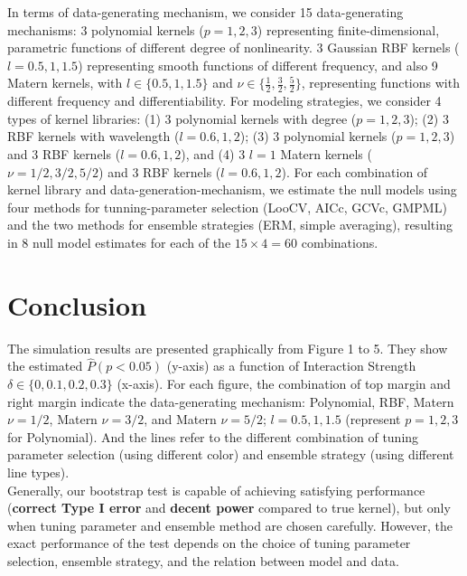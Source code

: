 \documentclass[11pt]{article}
\begin{document}
In terms of data-generating mechanism, we consider 15 data-generating mechanisms: 3 polynomial kernels ($p=1, 2, 3$) representing finite-dimensional, parametric functions of different degree of nonlinearity. 3 Gaussian RBF kernels ($l=0.5, 1, 1.5$) representing smooth functions of different frequency, and also 9 Matern kernels, with $l \in \{0.5, 1, 1.5\}$ and $\nu \in \{\frac{1}{2}, \frac{3}{2}, \frac{5}{2}\}$, representing functions with different frequency and differentiability. For modeling strategies, we consider 4 types of kernel libraries: (1) 3 polynomial kernels with degree ($p=1, 2, 3$); (2) 3 RBF kernels with wavelength ($l=0.6, 1, 2$); (3) 3 polynomial kernels ($p=1, 2, 3$) and 3 RBF kernels ($l=0.6, 1, 2$), and (4) 3 $l=1$ Matern kernels ($\nu=1/2, 3/2, 5/2$) and 3 RBF kernels ($l=0.6, 1, 2$). For each combination of kernel library and data-generation-mechanism, we estimate the null models using four methods for tunning-parameter selection (LooCV, AICc, GCVc, GMPML) and the two methods for ensemble strategies (ERM, simple averaging), resulting in 8 null model estimates for each of the $15 \times 4 = 60$ combinations.

\section{{\bf Conclusion}}
The simulation results are presented graphically from Figure 1 to 5. They show the estimated $\hat{P}(p<0.05)$ (y-axis) as a function of Interaction Strength $\delta \in \{0, 0.1, 0.2, 0.3\}$ (x-axis). For each figure, the combination of top margin and right margin indicate the data-generating mechanism: Polynomial, RBF, Matern $\nu=1/2$, Matern $\nu=3/2$, and Matern $\nu=5/2$; $l=0.5, 1, 1.5$ (represent $p=1, 2, 3$ for Polynomial). And the lines refer to the different combination of tuning parameter selection (using different color) and ensemble strategy (using different line types).\\

Generally, our bootstrap test is capable of achieving satisfying performance (\textbf{correct Type I error} and \textbf{decent power} compared to true kernel), but only when tuning parameter and ensemble method are chosen carefully. However, the exact performance of the test depends on the choice of tuning parameter selection, ensemble strategy, and the relation between model and data.
\end{document}
